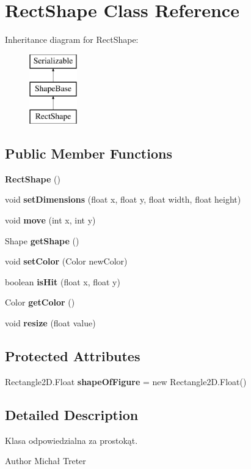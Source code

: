 \section{Rect\+Shape Class Reference}
\label{class_rect_shape}
Inheritance diagram for Rect\+Shape\+:\begin{figure}[H]
\begin{center}
\leavevmode
\includegraphics[height=3.000000cm]{class_rect_shape}
\end{center}
\end{figure}
\subsection*{Public Member Functions}
\begin{DoxyCompactItemize}
\item 
\textbf{ Rect\+Shape} ()
\item 
void \textbf{ set\+Dimensions} (float x, float y, float width, float height)
\item 
void \textbf{ move} (int x, int y)
\item 
Shape \textbf{ get\+Shape} ()
\item 
void \textbf{ set\+Color} (Color new\+Color)
\item 
boolean \textbf{ is\+Hit} (float x, float y)
\item 
Color \textbf{ get\+Color} ()
\item 
void \textbf{ resize} (float value)
\end{DoxyCompactItemize}
\subsection*{Protected Attributes}
\begin{DoxyCompactItemize}
\item 
Rectangle2\+D.\+Float \textbf{ shape\+Of\+Figure} = new Rectangle2\+D.\+Float()
\end{DoxyCompactItemize}


\subsection{Detailed Description}
Klasa odpowiedzialna za prostokąt. \begin{DoxyAuthor}{Author}
Michał Treter 
\end{DoxyAuthor}


